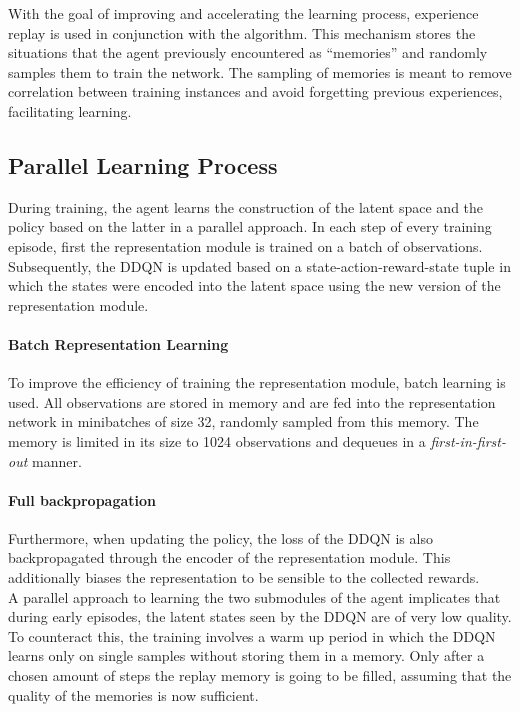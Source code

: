 With the goal of improving and accelerating the learning process, experience replay \citep{replay_memory_oc} is used in conjunction with the algorithm. This mechanism stores the situations that the agent previously encountered as ``memories'' and randomly samples them to train the network. The sampling of memories is meant to remove correlation between training instances and avoid forgetting previous experiences, facilitating learning.

\subsection{Parallel Learning Process}
During training, the agent learns the construction of the latent space and the policy based on the latter in a parallel approach. In each step of every training episode, first the representation module is trained on a batch of observations. Subsequently, the DDQN is updated based on a state-action-reward-state tuple in which the states were encoded into the latent space using the new version of the representation module. 

\paragraph{Batch Representation Learning} To improve the efficiency of training the representation module, batch learning is used. All observations are stored in memory and are fed into the representation network in minibatches of size 32, randomly sampled from this memory. The memory is limited in its size to 1024 observations and dequeues in a \textit{first-in-first-out} manner.

\paragraph{Full backpropagation} Furthermore, when updating the policy, the loss of the DDQN is also backpropagated through the encoder of the representation module. This additionally biases the representation to be sensible to the collected rewards.\\

A parallel approach to learning the two submodules of the agent implicates that during early episodes, the latent states seen by the DDQN are of very low quality. To counteract this, the training involves a warm up period in which the DDQN learns only on single samples without storing them in a memory. Only after a chosen amount of steps the replay memory is going to be filled, assuming that the quality of the memories is now sufficient.

